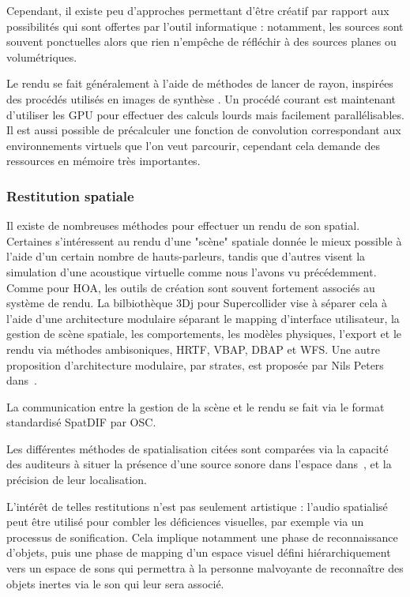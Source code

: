 \documentclass[french,12pt]{article}
\begin{document}
Cependant, il existe peu d'approches permettant d'être créatif par rapport aux possibilités qui sont offertes par l'outil informatique : notamment, les sources sont souvent ponctuelles alors que rien n'empêche de réfléchir à des sources planes ou volumétriques. 

Le rendu se fait généralement à l'aide de méthodes de lancer de rayon, inspirées des procédés utilisés en images de synthèse \cite{funkhouser_beam_1998,tsingos_fast_1998}.
Un procédé courant est maintenant d'utiliser les \ac{GPU} pour effectuer des calculs lourds mais facilement parallélisables\cite{rodriguez_performance_2014,cheng_design_2014,taylor_guided_2012}. Il est aussi possible de précalculer une fonction de convolution correspondant aux environnements virtuels que l'on veut parcourir, cependant cela demande des ressources en mémoire très importantes\cite{raghuvanshi_parametric_2014}.

\subsubsection{Restitution spatiale}
Il existe de nombreuses méthodes pour effectuer un rendu de son spatial. Certaines s'intéressent au rendu d'une "scène" spatiale donnée le mieux possible à l'aide d'un certain nombre de hauts-parleurs, tandis que d'autres visent la simulation d'une acoustique virtuelle comme nous l'avons vu précédemment. Comme pour HOA, les outils de création sont souvent fortement associés au système de rendu. La bilbiothèque 3Dj\cite{perez-lopez_3dj_2015} pour Supercollider vise à séparer cela à l'aide d'une architecture modulaire séparant le mapping d'interface utilisateur, la gestion de scène spatiale, les comportements, les modèles physiques, l'export et le rendu via méthodes ambisoniques, HRTF\cite{noisternig_3d_2003}, \ac{VBAP}, \ac{DBAP} et \ac{WFS}. Une autre proposition d'architecture modulaire, par strates, est proposée par Nils Peters dans~\cite{peters_stratified_2009}.

La communication entre la gestion de la scène et le rendu se fait via le format standardisé SpatDIF\cite{peters_spatial_2013} par OSC. %

Les différentes méthodes de spatialisation citées sont comparées via la capacité des auditeurs à situer la présence d'une source sonore dans l'espace dans~\cite{bates_comparative_2007}, et la précision de leur localisation.

L'intérêt de telles restitutions n'est pas seulement artistique : l'audio spatialisé peut être utilisé pour combler les déficiences visuelles, par exemple via un processus de sonification\cite{tang_assistive_2014}. Cela implique notamment une phase de reconnaissance d'objets, puis une phase de mapping d'un espace visuel défini hiérarchiquement vers un espace de sons qui permettra à la personne malvoyante de reconnaître des objets inertes via le son qui leur sera associé.
\end{document}

